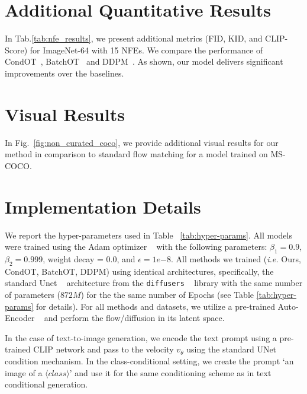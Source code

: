 \appendix

\section{Additional Quantitative Results}

In Tab.\ref{tab:nfe_results}, we present additional metrics (FID, KID, and CLIP-Score) for ImageNet-64 with 15 NFEs. We compare the performance of CondOT~\cite{lipman2022flow}, BatchOT~\cite{pooladian2023multisample} and  DDPM~\cite{ho2020denoising}.
As shown, our model delivers significant improvements over the baselines.
\section{Visual Results}
\label{sec:visuals_appendix}



In Fig.~\ref{fig:non_curated_coco}, we provide additional visual results for our method in comparison to standard flow matching for a model trained on MS-COCO.

\section{Implementation Details}
\label{sec:implementation_details}

We report the hyper-parameters used in Table ~\ref{tab:hyper-params}. All models were trained using the Adam optimizer ~\cite{kingma2017adammethodstochasticoptimization} with the following parameters: $\beta_1 = 0.9$, $\beta_2=0.999$, weight decay = 0.0, and $\epsilon = 1e{-8}$. 
All methods we trained (\emph{i.e.} Ours, CondOT, BatchOT, DDPM) using  identical architectures, specifically, the standard Unet ~\cite{ronneberger2015unetconvolutionalnetworksbiomedical} architecture from the \texttt{diffusers} ~\cite{von-platen-etal-2022-diffusers} library with the same number of parameters ($872M$) for the the same number of Epochs (see Table \ref{tab:hyper-params} for details). For all methods and datasets, we utilize a pre-trained Auto-Encoder ~\cite{oord2018neuraldiscreterepresentationlearning} and perform the flow/diffusion in its latent space.

In the case of text-to-image generation, we encode the text prompt using a pre-trained CLIP network and pass to the velocity $v_\theta$ using the standard UNet condition mechanism. In the class-conditional setting, we create the prompt `an image of a $\langle class \rangle$' and use it for the same conditioning scheme as in text conditional generation.

